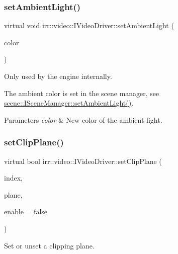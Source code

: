 \subsubsection{\texorpdfstring{set\+Ambient\+Light()}{setAmbientLight()}}
{\footnotesize\ttfamily virtual void irr\+::video\+::\+I\+Video\+Driver\+::set\+Ambient\+Light (\begin{DoxyParamCaption}\item[{const \hyperlink{classirr_1_1video_1_1SColorf}{S\+Colorf} \&}]{color }\end{DoxyParamCaption})\hspace{0.3cm}{\ttfamily [pure virtual]}}



Only used by the engine internally. 

The ambient color is set in the scene manager, see \hyperlink{classirr_1_1scene_1_1ISceneManager_a8a424accb615c4f60fde59f55033a816}{scene\+::\+I\+Scene\+Manager\+::set\+Ambient\+Light()}. 
\begin{DoxyParams}{Parameters}
{\em color} & New color of the ambient light. \\
\hline
\end{DoxyParams}
\mbox{\label{classirr_1_1video_1_1IVideoDriver_a959ac385891941e7ec8d99b2f105b265}} 
\subsubsection{\texorpdfstring{set\+Clip\+Plane()}{setClipPlane()}}
{\footnotesize\ttfamily virtual bool irr\+::video\+::\+I\+Video\+Driver\+::set\+Clip\+Plane (\begin{DoxyParamCaption}\item[{\hyperlink{namespaceirr_a0416a53257075833e7002efd0a18e804}{u32}}]{index,  }\item[{const \hyperlink{namespaceirr_1_1core_ae7491b7985dcb74b840bfcd9c054b232}{core\+::plane3df} \&}]{plane,  }\item[{bool}]{enable = {\ttfamily false} }\end{DoxyParamCaption})\hspace{0.3cm}{\ttfamily [pure virtual]}}



Set or unset a clipping plane. 

